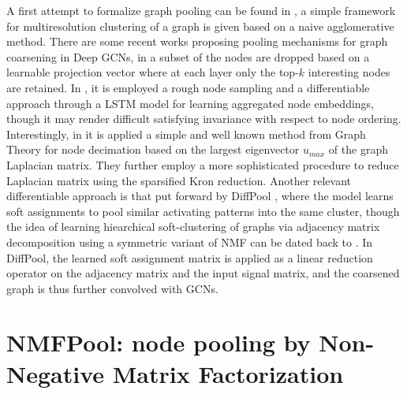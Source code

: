 \documentclass[runningheads]{llncs}
\begin{document}
A first attempt to formalize graph pooling can be found in \cite{bruna}, a simple framework for multiresolution clustering of a graph is given based on a naive agglomerative method. There are some recent works proposing pooling mechanisms for graph coarsening in Deep GCNs, in \cite{2018arXiv181101287C} a subset of the nodes are dropped based on a learnable projection vector where at each layer only the top-$k$ interesting nodes are retained.
In \cite{DBLP:journals/corr/HamiltonYL17}, it is employed a rough node sampling and a differentiable approach through a LSTM model for learning aggregated node embeddings, though it may render difficult satisfying invariance with respect to node ordering.
Interestingly, in \cite{DBLP:journals/corr/abs-1901-01343} it is applied a simple and well known method from Graph Theory for node decimation based on the largest eigenvector $u_{max}$ of the graph Laplacian matrix. They further employ a more sophisticated procedure to reduce Laplacian matrix using the sparsified Kron reduction.
Another relevant differentiable approach is that
put forward by DiffPool \cite{NIPS2018_7729}, where the model learns soft assignments to pool similar activating patterns into the same cluster, though the idea of learning hiearchical soft-clustering of graphs via adjacency matrix decomposition using a symmetric variant of NMF can be dated back to \cite{NIPS2005_2948}. In DiffPool, the learned soft assignment matrix is applied as a linear reduction operator on the adjacency matrix and the input signal matrix, and the coarsened graph is thus further convolved with GCNs.




\section{NMFPool: node pooling by Non-Negative Matrix Factorization}
\end{document}

